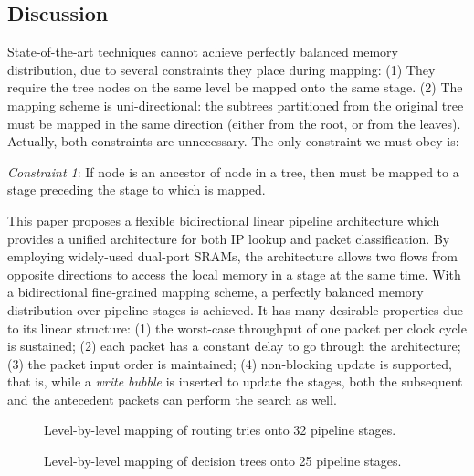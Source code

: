 \documentclass{sigcomm-alternate}
\begin{document}
\subsection{Discussion}
\label{sec:discussion}

State-of-the-art techniques cannot achieve perfectly balanced memory distribution, due to several constraints they place during mapping: (1) They require the tree nodes on the same level be mapped onto the same stage. (2) The mapping scheme is uni-directional: the subtrees partitioned from the original tree must be mapped in the same direction (either from the root, or from the leaves). Actually, both constraints are unnecessary. The only constraint we must obey is:

\textit{Constraint 1}: If node  is an ancestor of node  in a tree, then  must be mapped to a stage preceding the stage to which  is mapped.


This paper proposes a flexible bidirectional linear pipeline architecture which provides a unified architecture for both IP lookup and packet classification. By employing widely-used dual-port SRAMs, the architecture allows two flows from opposite directions to access the local memory in a stage at the same time. With a bidirectional fine-grained mapping scheme, a perfectly balanced memory distribution over pipeline stages is achieved. It has many desirable properties due to its linear structure: (1) the worst-case throughput of one packet per clock cycle is sustained; (2) each packet has a constant delay to go through the architecture; (3) the packet input order is maintained; (4) non-blocking update is supported, that is, while a \textit{write bubble} is inserted to update the stages, both the subsequent and the antecedent packets can perform the search as well. 

\begin{figure*}[hbt]
\centering
{}
\hfil
{}
\caption{Level-by-level mapping of routing tries onto 32 pipeline stages.}
\label{fig:level_mapping}
\end{figure*}

\begin{figure*}[hbt]
\centering
{}
\hfil
{}
\caption{Level-by-level mapping of decision trees onto 25 pipeline stages.}
\label{fig:pkt_level_mapping}
\end{figure*}
\end{document}
